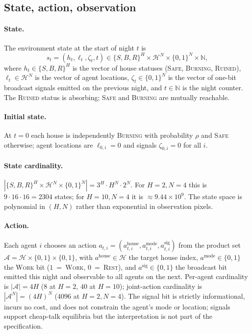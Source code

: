 \documentclass{anvil-paper}
\begin{document}
\subsection{State, action, observation}
\label{app:envspec:soa}

\paragraph{State.} The environment state at the start of night $t$ is
\[
  s_t = (h_t,\ell_t,\zeta_t,t)\in\{S,B,R\}^H\times
        \mathcal{H}^N\times\{0,1\}^N\times\mathbb{N},
\]
where $h_t\in\{S,B,R\}^H$ is the vector of house statuses (\textsc{Safe},
\textsc{Burning}, \textsc{Ruined}), $\ell_t\in\mathcal{H}^N$ is the
vector of agent locations, $\zeta_t\in\{0,1\}^N$ is the vector of one-bit
broadcast signals emitted on the previous night, and $t\in\mathbb{N}$ is
the night counter. The \textsc{Ruined} status is absorbing; \textsc{Safe}
and \textsc{Burning} are mutually reachable.

\paragraph{Initial state.} At $t{=}0$ each house is independently
\textsc{Burning} with probability $\rho$ and \textsc{Safe} otherwise;
agent locations are $\ell_{0,i}{=}0$ and signals $\zeta_{0,i}{=}0$ for
all $i$.

\paragraph{State cardinality.}
$|\{S,B,R\}^H\times\mathcal{H}^N\times\{0,1\}^N|=3^H\cdot H^N\cdot 2^N$.
For $H{=}2,N{=}4$ this is $9\cdot 16\cdot 16=2304$ states; for
$H{=}10,N{=}4$ it is $\approx 9.44\times 10^{9}$. The state space is
polynomial in $(H,N)$ rather than exponential in observation pixels.

\paragraph{Action.} Each agent $i$ chooses an action $a_{t,i}=
(a_{t,i}^{\text{house}},a_{t,i}^{\text{mode}},a_{t,i}^{\text{sig}})$
from the product set $\mathcal{A}=\mathcal{H}\times\{0,1\}\times\{0,1\}$,
with $a^{\text{house}}\in\mathcal{H}$ the target house index,
$a^{\text{mode}}\in\{0,1\}$ the \textsc{Work} bit ($1$~=~\textsc{Work},
$0$~=~\textsc{Rest}), and $a^{\text{sig}}\in\{0,1\}$ the broadcast bit
emitted this night and observable to all agents on the next. Per-agent
cardinality is $|\mathcal{A}|=4H$ ($8$ at $H{=}2$, $40$ at $H{=}10$);
joint-action cardinality is $|\mathcal{A}^N|=(4H)^N$ ($4096$ at
$H{=}2,N{=}4$). The signal bit is strictly informational, incurs no
cost, and does not constrain the agent's mode or location; signals
support cheap-talk equilibria but the interpretation is not part of the
specification.
\end{document}
